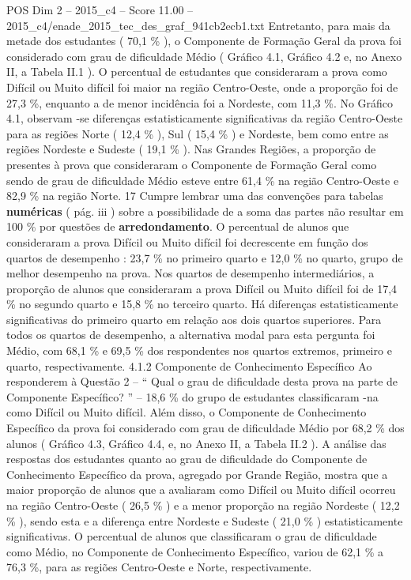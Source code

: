 \begin{textsample}{POS Dim 2 – 2015\_c4 – Score 11.00 – 2015\_c4/enade\_2015\_tec\_des\_graf\_941cb2ecb1.txt}
Entretanto, para mais da metade dos estudantes ( 70,1 \% ), o Componente de Formação Geral da prova foi considerado com grau de dificuldade Médio ( Gráfico 4.1, Gráfico 4.2 e, no Anexo II, a Tabela II.1 ).
O percentual de estudantes que consideraram a prova como Difícil ou Muito difícil foi maior na região Centro-Oeste, onde a proporção foi de 27,3 \%, enquanto a de menor incidência foi a Nordeste, com 11,3 \%.
No Gráfico 4.1, observam -se diferenças estatisticamente significativas da região Centro-Oeste para as regiões Norte ( 12,4 \% ), Sul ( 15,4 \% ) e Nordeste, bem como entre as regiões Nordeste e Sudeste ( 19,1 \% ).
Nas Grandes Regiões, a proporção de presentes à prova que consideraram o Componente de Formação Geral como sendo de grau de dificuldade Médio esteve entre 61,4 \% na região Centro-Oeste e 82,9 \% na região Norte. 17 Cumpre lembrar uma das convenções para tabelas \textbf{numéricas} ( pág. iii ) sobre a possibilidade de a soma das partes não resultar em 100 \% por questões de \textbf{arredondamento}.
O percentual de alunos que consideraram a prova Difícil ou Muito difícil foi decrescente em função dos quartos de desempenho : 23,7 \% no primeiro quarto e 12,0 \% no quarto, grupo de melhor desempenho na prova.
Nos quartos de desempenho intermediários, a proporção de alunos que consideraram a prova Difícil ou Muito difícil foi de 17,4 \% no segundo quarto e 15,8 \% no terceiro quarto.
Há diferenças estatisticamente significativas do primeiro quarto em relação aos dois quartos superiores.
Para todos os quartos de desempenho, a alternativa modal para esta pergunta foi Médio, com 68,1 \% e 69,5 \% dos respondentes nos quartos extremos, primeiro e quarto, respectivamente. 4.1.2 Componente de Conhecimento Específico Ao responderem à Questão 2 – “ Qual o grau de dificuldade desta prova na parte de Componente Específico? ” – 18,6 \% do grupo de estudantes classificaram -na como Difícil ou Muito difícil.
Além disso, o Componente de Conhecimento Específico da prova foi considerado com grau de dificuldade Médio por 68,2 \% dos alunos ( Gráfico 4.3, Gráfico 4.4, e, no Anexo II, a Tabela II.2 ).
A análise das respostas dos estudantes quanto ao grau de dificuldade do Componente de Conhecimento Específico da prova, agregado por Grande Região, mostra que a maior proporção de alunos que a avaliaram como Difícil ou Muito difícil ocorreu na região Centro-Oeste ( 26,5 \% ) e a menor proporção na região Nordeste ( 12,2 \% ), sendo esta e a diferença entre Nordeste e Sudeste ( 21,0 \% ) estatisticamente significativas.
O percentual de alunos que classificaram o grau de dificuldade como Médio, no Componente de Conhecimento Específico, variou de 62,1 \% a 76,3 \%, para as regiões Centro-Oeste e Norte, respectivamente.

\end{textsample}
